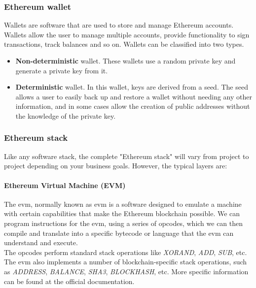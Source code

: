         \subsubsection{Ethereum wallet}
            Wallets are software that are used to store and manage Ethereum accounts. Wallets allow the user to manage multiple accounts, provide functionality to sign transactions, track balances and so on. Wallets can be classified into two types.
            \begin{itemize}
                \item \textbf{Non-deterministic} wallet. These wallets use a random private key and generate a private key from it.
                \item \textbf{Deterministic} wallet. In this wallet, keys are derived from a seed. The seed allows a user to easily back up and restore a wallet without needing any other information, and in some cases allow the creation of public addresses without the knowledge of the private key.
            \end{itemize}
        
        \subsubsection{Ethereum stack}
            Like any software stack, the complete "Ethereum stack"\cite{ethereumStack} will vary from project to project depending on your business goals. However, the typical layers are:
            \paragraph{Ethereum Virtual Machine (EVM)}
                The \acrlong{evm}\cite{evm}, normally known as \acrshort{evm} is a software designed to emulate a machine with certain capabilities that make the Ethereum blockchain possible. We can program instructions for the \acrshort{evm}, using a series of opcodes, which we can then compile and translate into a specific bytecode or language that the \acrshort{evm} can understand and execute.\\
                
                The opcodes perform standard stack operations like \textit{XORAND}, \textit{ADD}, \textit{SUB}, etc. The \acrshort{evm} also implements a number of blockchain-specific stack operations, such as \textit{ADDRESS}, \textit{BALANCE}, \textit{SHA3}, \textit{BLOCKHASH}, etc. More specific information can be found at the official documentation\cite{opcodes}.\\
                
